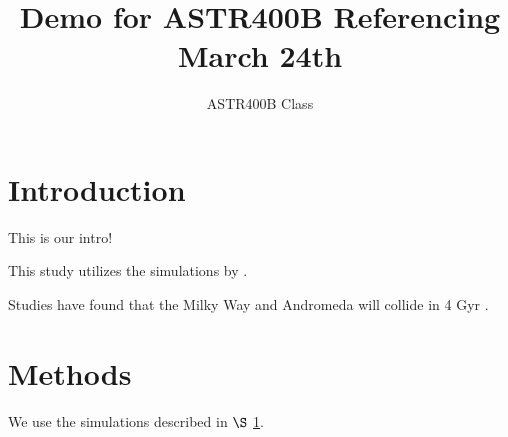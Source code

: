 \documentclass[twocolumn]{aastex63}
\begin{document}
\title{Demo for ASTR400B Referencing March 24th }
\author{ASTR400B Class}



\section{Introduction}
\label{sec:intro}

This is our intro! 

This study utilizes the simulations by \cite{vdm12}.

Studies have found that the Milky Way and Andromeda will collide in 4 Gyr \citep[e.g.][and many others]{vdm12,vdm19}. 


\section{Methods}

We use the simulations described in $\S$ \ref{sec:intro}.


{}

\end{document}
